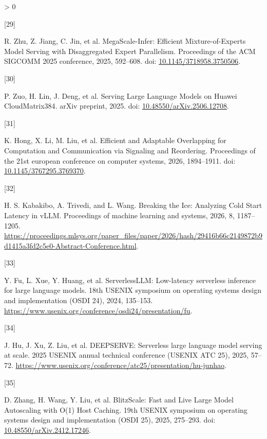 \documentclass[UTF8,10.5pt,fontset=windows]{ctexart}
\newlength{\cslhangindent}
\newlength{\csllabelwidth}
\newenvironment{CSLReferences}[2] %
 {%
  \setlength{\parindent}{0pt}
  \ifodd #1 \everypar{\setlength{\hangindent}{\cslhangindent}}\ignorespaces\fi
  \ifnum #2 > 0
  \setlength{\parskip}{#2\baselineskip}
  \fi
 }%
 {}
\newcommand{\CSLLeftMargin}[1]{\parbox[t]{\csllabelwidth}{#1}}
\newcommand{\CSLRightInline}[1]{\parbox[t]{\linewidth - \csllabelwidth}{#1}\break}
\begin{document}
\begin{CSLReferences}{0}{0}
\leavevmode{}%
\CSLLeftMargin{{[}29{]} }
\CSLRightInline{R. Zhu, Z. Jiang, C. Jin, et al. {MegaScale-Infer:
Efficient Mixture-of-Experts Model Serving with Disaggregated Expert
Parallelism}. Proceedings of the ACM SIGCOMM 2025 conference, 2025,
592--608. doi:
\href{https://doi.org/10.1145/3718958.3750506}{10.1145/3718958.3750506}.}

\leavevmode{}%
\CSLLeftMargin{{[}30{]} }
\CSLRightInline{P. Zuo, H. Lin, J. Deng, et al. {Serving Large Language
Models on Huawei CloudMatrix384}. arXiv preprint, 2025. doi:
\href{https://doi.org/10.48550/arXiv.2506.12708}{10.48550/arXiv.2506.12708}.}

\leavevmode{}%
\CSLLeftMargin{{[}31{]} }
\CSLRightInline{K. Hong, X. Li, M. Liu, et al. {Efficient and Adaptable
Overlapping for Computation and Communication via Signaling and
Reordering}. Proceedings of the 21st european conference on computer
systems, 2026, 1894--1911. doi:
\href{https://doi.org/10.1145/3767295.3769370}{10.1145/3767295.3769370}.}

\leavevmode{}%
\CSLLeftMargin{{[}32{]} }
\CSLRightInline{H. S. Kabakibo, A. Trivedi, and L. Wang. {Breaking the
Ice: Analyzing Cold Start Latency in vLLM}. Proceedings of machine
learning and systems, 2026, 8, 1187--1205.
\url{https://proceedings.mlsys.org/paper_files/paper/2026/hash/29416b66c2149872b9d1415a3fd2c5e0-Abstract-Conference.html}.}

\leavevmode{}%
\CSLLeftMargin{{[}33{]} }
\CSLRightInline{Y. Fu, L. Xue, Y. Huang, et al. ServerlessLLM:
Low-latency serverless inference for large language models. 18th USENIX
symposium on operating systems design and implementation (OSDI 24),
2024, 135--153.
\url{https://www.usenix.org/conference/osdi24/presentation/fu}.}

\leavevmode{}%
\CSLLeftMargin{{[}34{]} }
\CSLRightInline{J. Hu, J. Xu, Z. Liu, et al. DEEPSERVE: Serverless large
language model serving at scale. 2025 USENIX annual technical conference
(USENIX ATC 25), 2025, 57--72.
\url{https://www.usenix.org/conference/atc25/presentation/hu-junhao}.}

\leavevmode{}%
\CSLLeftMargin{{[}35{]} }
\CSLRightInline{D. Zhang, H. Wang, Y. Liu, et al. {BlitzScale: Fast and
Live Large Model Autoscaling with O(1) Host Caching}. 19th USENIX
symposium on operating systems design and implementation (OSDI 25),
2025, 275--293. doi:
\href{https://doi.org/10.48550/arXiv.2412.17246}{10.48550/arXiv.2412.17246}.}


\end{CSLReferences}
\end{document}
